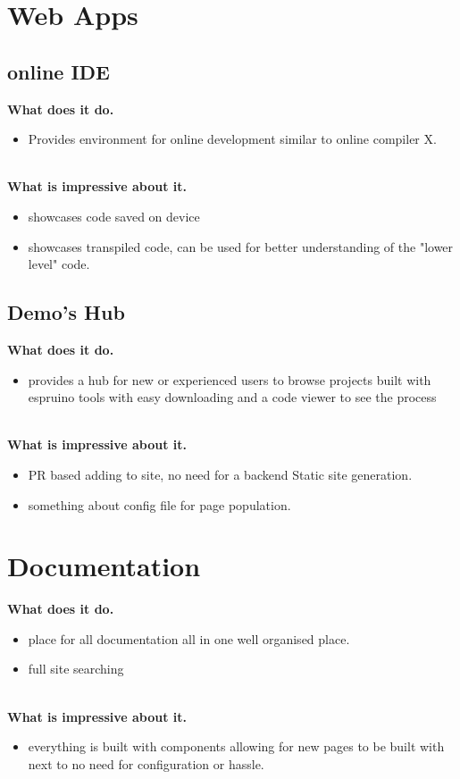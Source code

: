 \documentclass{l4proj}
\begin{document}
\section{Web Apps}

\subsection{online IDE}

\textbf{What does it do.}
\begin{itemize}
    \item Provides environment for online development similar to online compiler X.
\end{itemize}
\\
\textbf{What is impressive about it.}
\begin{itemize}
    \item showcases code saved on device
    \item showcases transpiled code, can be used for better understanding of the "lower level" code.
\end{itemize}

\subsection{Demo's Hub}
\textbf{What does it do.}
\begin{itemize}
    \item provides a hub for new or experienced users to browse projects built with espruino tools with easy downloading and a code viewer to see the process
\end{itemize}
\\
\textbf{What is impressive about it.}
\begin{itemize}
    \item PR based adding to site, no need for a backend Static site generation.
    \item something about config file for page population.
\end{itemize}

\section{Documentation}
\textbf{What does it do.}
\begin{itemize}
    \item place for all documentation all in one well organised place.
    \item full site searching
\end{itemize}
\\
\textbf{What is impressive about it.}
\begin{itemize}
    \item everything is built with components allowing for new pages to be built with next to no need for configuration or hassle.
\end{itemize}
\end{document}
